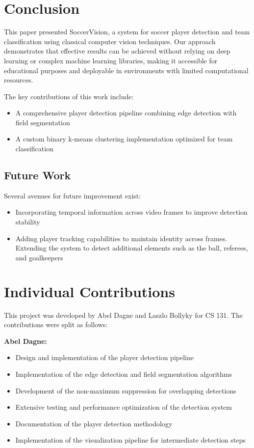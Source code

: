 \documentclass[10pt,twocolumn,letterpaper]{article}
\begin{document}
\section{Conclusion}
\label{sec:conclusion}

This paper presented SoccerVision, a system for soccer player detection and team classification using classical computer vision techniques. Our approach demonstrates that effective results can be achieved without relying on deep learning or complex machine learning libraries, making it accessible for educational purposes and deployable in environments with limited computational resources.

The key contributions of this work include:
\begin{itemize}
    \item A comprehensive player detection pipeline combining edge detection with field segmentation
    \item A custom binary k-means clustering implementation optimized for team classification
\end{itemize}

\subsection{Future Work}

Several avenues for future improvement exist:
\begin{itemize}
    \item Incorporating temporal information across video frames to improve detection stability
    \item Adding player tracking capabilities to maintain identity across frames. Extending the system to detect additional elements such as the ball, referees, and goalkeepers
\end{itemize}

\section{Individual Contributions}
\label{sec:contributions}

This project was developed by Abel Dagne and Laszlo Bollyky for CS 131. The contributions were split as follows:

\textbf{Abel Dagne:}
\begin{itemize}
    \item Design and implementation of the player detection pipeline
    \item Implementation of the edge detection and field segmentation algorithms
    \item Development of the non-maximum suppression for overlapping detections
    \item Extensive testing and performance optimization of the detection system
    \item Documentation of the player detection methodology
    \item Implementation of the visualization pipeline for intermediate detection steps
\end{itemize}
\end{document}
